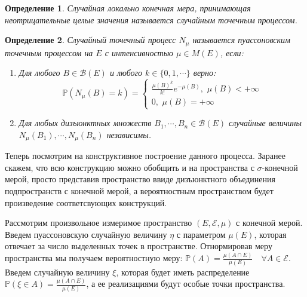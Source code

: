 \documentclass[12pt,a4paper]{article} %
\newtheorem{definition}{Определение}
\newcommand{\PR}{\mathbb{P}}
\begin{document}
	\begin{definition}
		Случайная локально конечная мера, принимающая неотрицательные целые значения называется случайным точечным процессом.
	\end{definition}
	\begin{definition}
		Случайный точечный процесс $N_{\mu}$ называется пуассоновским точечным процессом на $E$ с интенсивностью $\mu\in M(E)$, если:
		\begin{enumerate}
			\item Для любого $B\in\mathcal{B}(E)$ и любого $k\in\{0,1,\cdots\}$ верно:
			\begin{equation*}
				\PR(N_{\mu}(B)=k)=
				\begin{cases}
					\frac{\mu(B)^k}{k!}e^{-\mu(B)},\,\,\mu(B)<+\infty \\
					0,\,\,\mu(B)=+\infty
				\end{cases}
			\end{equation*}
			\item Для любых дизъюнктных множеств $B_1,\cdots,B_n\in\mathcal{B}(E)$ случайные величины $N_{\mu}(B_1),\cdots,N_{\mu}(B_n)$ независимы.
		\end{enumerate}
	\end{definition}
	
	Теперь посмотрим на конструктивное построение данного процесса. Заранее скажем, что всю конструкцию можно обобщить и на пространства с $\sigma$-конечной мерой, просто представив пространство ввиде дизъюнктного объединения подпространств с конечной мерой, а вероятностным пространством будет произведение соответсвующих конструкций.
	
	Рассмотрим произвольное измеримое пространство $(E,\mathcal{E},\mu)$ с конечной мерой. Введем пуассоновскую случайную величину $\eta$ с параметром $\mu(E)$, которая отвечает за число выделенных точек в пространстве. Отнормировав меру пространства мы получаем вероятностную меру: $\PR(A)=\displaystyle\frac{\mu (A\cap E)}{\mu (E)}\quad \forall A\in \mathcal{E}.$ Введем случайную величину $\xi$, которая будет иметь распределение $\PR (\xi \in A)=\displaystyle\frac{\mu (A\cap E)}{\mu (E)}$, а ее реализациями будут особые точки пространства.
	
\end{document}
